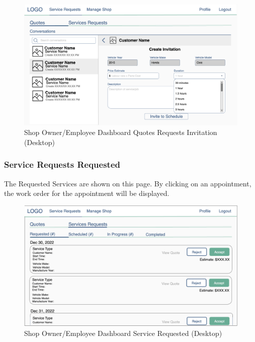\documentclass[12pt, titlepage]{article}
\begin{document}
\begin{figure}[H]
	\centering
	\includegraphics[width=\textwidth]{mockups/Shop Owner Dashboard (Quotes Requests - Invitation) (Desktop).png}
	\caption{Shop Owner/Employee Dashboard \textemdash{} Quotes Requests \textemdash{} Invitation (Desktop)}
\end{figure}

\subsubsection{Service Requests \textemdash{} Requested} The Requested Services are shown on this page. By clicking on an appointment, the work
order for the appointment will be displayed.

\begin{figure}[H]
	\centering
	\includegraphics[width=\textwidth]{mockups/Shop Owner Dashboard (Service Requests - Requested) (Desktop).png}
	\caption{Shop Owner/Employee Dashboard \textemdash{} Service \textemdash{} Requested (Desktop)}
\end{figure}
\end{document}
